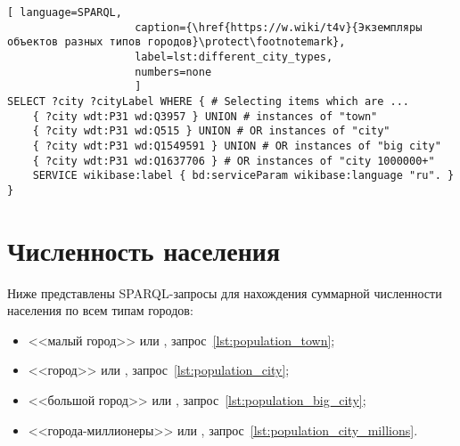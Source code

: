 \begin{lstlisting}[ language=SPARQL, 
                    caption={\href{https://w.wiki/t4v}{Экземпляры объектов разных типов городов}\protect\footnotemark},
                    label=lst:different_city_types,
                    numbers=none
                    ]
SELECT ?city ?cityLabel WHERE { # Selecting items which are ...
	{ ?city wdt:P31 wd:Q3957 } UNION # instances of "town"
	{ ?city wdt:P31 wd:Q515 } UNION # OR instances of "city"
	{ ?city wdt:P31 wd:Q1549591 } UNION # OR instances of "big city"
	{ ?city wdt:P31 wd:Q1637706 } # OR instances of "city 1000000+"                                
	SERVICE wikibase:label { bd:serviceParam wikibase:language "ru". }
}
\end{lstlisting}




\section{Численность населения}

\marginnote{ %
    \MarginQuestion
    Какие из городов названы в честь географических объектов?%
\begin{itemize}
\item \href{https://w.wiki/oL6}{Тольятти}
\item \href{https://w.wiki/oL5}{Тула}
\item \href{https://w.wiki/oL4}{Черняховск}
\item \href{https://w.wiki/oL3}{Курильск}
\item \href{https://w.wiki/oL2}{Вологда}
\item \href{https://w.wiki/oK$}{Обнинск}
\end{itemize}
См. ответ~\ref{answer:cities_geographic_objects} на с.~\pageref{answer:cities_geographic_objects}.
}

Ниже представлены SPARQL-запросы для нахождения суммарной численности населения по всем типам городов: 
\begin{itemize}[leftmargin=24pt]
	\item <<малый город>> или , запрос~\ref{lst:population_town};
	\item <<город>> или , запрос~\ref{lst:population_city};
	\item <<большой город>> или , запрос~\ref{lst:population_big_city};
	\item <<города-миллионеры>> или , запрос~\ref{lst:population_city_millions}.
\end{itemize}
%




